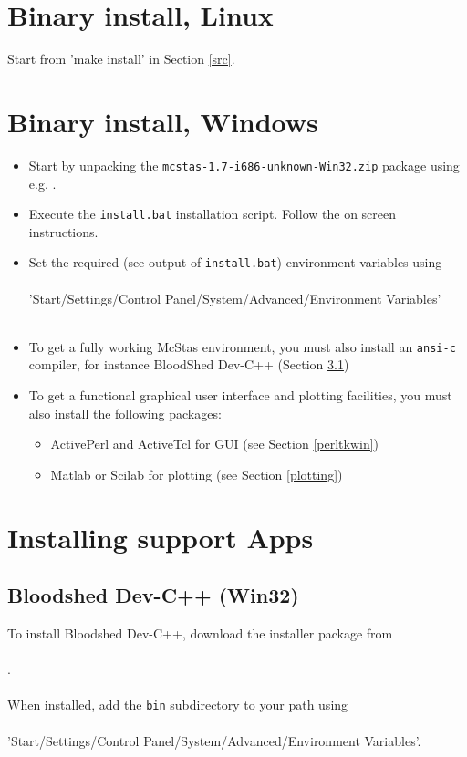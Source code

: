 \documentclass[a4paper,12pt]{article}
\begin{document}
\section{Binary install, Linux}
\label{linbin}
Start from 'make install' in Section \ref{src}.
\section{Binary install, Windows}
\label{winbin}
\begin{itemize}
\item{Start by unpacking the \texttt{mcstas-1.7-i686-unknown-Win32.zip} package using
e.g. .}
\item{Execute the \texttt{install.bat} installation script. Follow the
  on screen instructions.}
\item{Set the required (see output of \texttt{install.bat}) environment variables using
\\\ \\
'Start/Settings/Control Panel/System/Advanced/Environment
Variables'\\\ \\}
\item{To get a fully working McStas environment, you must also install
    an \texttt{ansi-c} compiler, for instance BloodShed Dev-C++
    (Section \ref{instblood})}
\item{To get a functional graphical user
    interface and plotting facilities, you must also install the following
    packages:}
  \begin{itemize}
    \item{ActivePerl and ActiveTcl for GUI (see Section \ref{perltkwin})}
    \item{Matlab or Scilab for plotting (see Section \ref{plotting})}
  \end{itemize}
\end{itemize}
\section{Installing support Apps}
\subsection{Bloodshed Dev-C++ (Win32)}
\label{instblood}
To install Bloodshed Dev-C++, download the installer package from
\\\
\\.\\\
\\
When installed, add the \texttt{bin} subdirectory to your path
using\\\ \\
'Start/Settings/Control Panel/System/Advanced/Environment Variables'.
\end{document}

